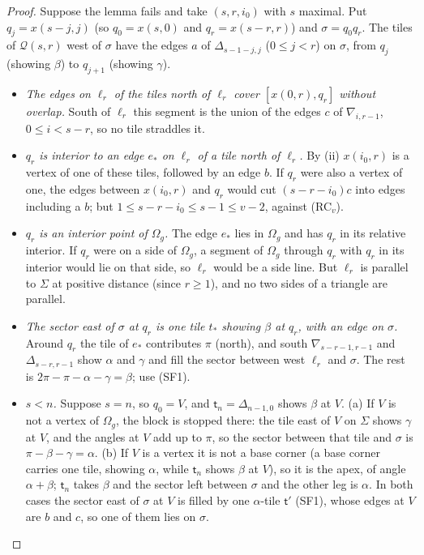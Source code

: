 \documentclass[11pt,reqno]{amsart}
\theoremstyle{plain}
\theoremstyle{definition}
\begin{document}
\begin{proof}
Suppose the lemma fails and take $(s,r,i_0)$ with $s$ maximal. Put $q_j=x(s-j,j)$ (so $q_0=x(s,0)$ and $q_r=x(s-r,r)$) and $\sigma=q_0q_r$. The tiles of $\mathcal Q(s,r)$ west of $\sigma$ have the edges $a$ of $\Delta_{s-1-j,j}$ ($0\le j<r$) on $\sigma$, from $q_j$ (showing $\beta$) to $q_{j+1}$ (showing $\gamma$).
\begin{itemize}
\item[\textbf{Tr1}] \emph{The edges on $\ell_r$ of the tiles north of $\ell_r$ cover $[x(0,r),q_r]$ without overlap.} South of $\ell_r$ this segment is the union of the edges $c$ of $\nabla_{i,r-1}$, $0\le i<s-r$, so no tile straddles it.
\item[\textbf{Tr2}] \emph{$q_r$ is interior to an edge $e_\ast$ on $\ell_r$ of a tile north of $\ell_r$.} By (ii) $x(i_0,r)$ is a vertex of one of these tiles, followed by an edge $b$. If $q_r$ were also a vertex of one, the edges between $x(i_0,r)$ and $q_r$ would cut $(s-r-i_0)c$ into edges including a $b$; but $1\le s-r-i_0\le s-1\le v-2$, against (RC$_v$).
\item[\textbf{Tr3}] \emph{$q_r$ is an interior point of $\Omega_{g}$.} The edge $e_\ast$ lies in $\Omega_{g}$ and has $q_r$ in its relative interior. If $q_r$ were on a side of $\Omega_{g}$, a segment of $\Omega_{g}$ through $q_r$ with $q_r$ in its interior would lie on that side, so $\ell_r$ would be a side line. But $\ell_r$ is parallel to $\Sigma$ at positive distance (since $r\ge1$), and no two sides of a triangle are parallel.
\item[\textbf{Tr4}] \emph{The sector east of $\sigma$ at $q_r$ is one tile $t_\ast$ showing $\beta$ at $q_r$, with an edge on $\sigma$.} Around $q_r$ the tile of $e_\ast$ contributes $\pi$ (north), and south $\nabla_{s-r-1,r-1}$ and $\Delta_{s-r,r-1}$ show $\alpha$ and $\gamma$ and fill the sector between west $\ell_r$ and $\sigma$. The rest is $2\pi-\pi-\alpha-\gamma=\beta$; use (SF1).
\item[\textbf{Tr5}] \emph{$s<n$.} Suppose $s=n$, so $q_0=V$, and $\mathsf t_n=\Delta_{n-1,0}$ shows $\beta$ at $V$. (a) If $V$ is not a vertex of $\Omega_{g}$, the block is stopped there: the tile east of $V$ on $\Sigma$ shows $\gamma$ at $V$, and the angles at $V$ add up to $\pi$, so the sector between that tile and $\sigma$ is $\pi-\beta-\gamma=\alpha$. (b) If $V$ is a vertex it is not a base corner (a base corner carries one tile, showing $\alpha$, while $\mathsf t_n$ shows $\beta$ at $V$), so it is the apex, of angle $\alpha+\beta$; $\mathsf t_n$ takes $\beta$ and the sector left between $\sigma$ and the other leg is $\alpha$. In both cases the sector east of $\sigma$ at $V$ is filled by one $\alpha$-tile $\mathsf t'$ (SF1), whose edges at $V$ are $b$ and $c$, so one of them lies on $\sigma$.

\end{itemize}
\end{proof}
\end{document}
